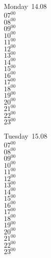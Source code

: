 \documentclass[11pt, a4paper]{book}\usepackage[]{graphicx}\usepackage[]{color}
\begin{document}
\begin{headerbox}
\end{headerbox}
\begin{weekdaybox}
  Monday~14.08\\
  { 
  \vfill
  $07^{00}$\\
$08^{00}$\\
$09^{00}$\\
$10^{00}$\\
$11^{00}$\\
$12^{00}$\\
$13^{00}$\\
$14^{00}$\\
$15^{00}$\\
$16^{00}$\\
$17^{00}$\\
$18^{00}$\\
$19^{00}$\\
$20^{00}$\\
$21^{00}$\\
$22^{00}$\\
$23^{00}$\\
  }
\end{weekdaybox}
\begin{weekdaybox}
  Tuesday~15.08\\
  { 
  \vfill
  $07^{00}$\\
$08^{00}$\\
$09^{00}$\\
$10^{00}$\\
$11^{00}$\\
$12^{00}$\\
$13^{00}$\\
$14^{00}$\\
$15^{00}$\\
$16^{00}$\\
$17^{00}$\\
$18^{00}$\\
$19^{00}$\\
$20^{00}$\\
$21^{00}$\\
$22^{00}$\\
$23^{00}$\\
  }
\end{weekdaybox}
\end{document}
